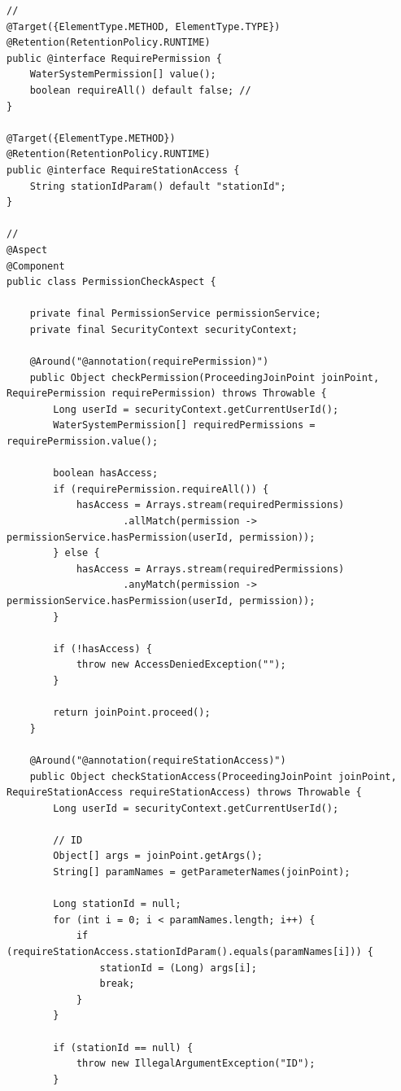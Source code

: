\begin{lstlisting}[style=java]
// 
@Target({ElementType.METHOD, ElementType.TYPE})
@Retention(RetentionPolicy.RUNTIME)
public @interface RequirePermission {
    WaterSystemPermission[] value();
    boolean requireAll() default false; // 
}

@Target({ElementType.METHOD})
@Retention(RetentionPolicy.RUNTIME)
public @interface RequireStationAccess {
    String stationIdParam() default "stationId";
}

// 
@Aspect
@Component
public class PermissionCheckAspect {
    
    private final PermissionService permissionService;
    private final SecurityContext securityContext;
    
    @Around("@annotation(requirePermission)")
    public Object checkPermission(ProceedingJoinPoint joinPoint, RequirePermission requirePermission) throws Throwable {
        Long userId = securityContext.getCurrentUserId();
        WaterSystemPermission[] requiredPermissions = requirePermission.value();
        
        boolean hasAccess;
        if (requirePermission.requireAll()) {
            hasAccess = Arrays.stream(requiredPermissions)
                    .allMatch(permission -> permissionService.hasPermission(userId, permission));
        } else {
            hasAccess = Arrays.stream(requiredPermissions)
                    .anyMatch(permission -> permissionService.hasPermission(userId, permission));
        }
        
        if (!hasAccess) {
            throw new AccessDeniedException("");
        }
        
        return joinPoint.proceed();
    }
    
    @Around("@annotation(requireStationAccess)")
    public Object checkStationAccess(ProceedingJoinPoint joinPoint, RequireStationAccess requireStationAccess) throws Throwable {
        Long userId = securityContext.getCurrentUserId();
        
        // ID
        Object[] args = joinPoint.getArgs();
        String[] paramNames = getParameterNames(joinPoint);
        
        Long stationId = null;
        for (int i = 0; i < paramNames.length; i++) {
            if (requireStationAccess.stationIdParam().equals(paramNames[i])) {
                stationId = (Long) args[i];
                break;
            }
        }
        
        if (stationId == null) {
            throw new IllegalArgumentException("ID");
        }
        

\end{lstlisting}
